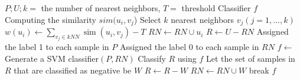 \documentclass{article}
\begin{document}
\begin{algorithm}[!h]
\renewcommand{\algorithmicrequire}{\textbf{Input:}} %
\renewcommand{\algorithmicensure}{\textbf{Output:}} %
	\caption{knn} %
	\begin{algorithmic}[1] %
	    \REQUIRE
	    $P;U;k=$ the number of nearest neighbors, $T=$ threshold 
	    \ENSURE
	    Classifier $f$ \\
		\STATE Computing the similarity $sim(u_i,v_j$)
		\ENDFOR
		\STATE Select $k$ nearest neighbors $v_j(j=1,\dots,k)$
		\STATE $w(u_i)\leftarrow \sum_{v_j\in kNN}\operatorname{sim}\left(u_i, v_j\right)-T$
		\STATE $RN\leftarrow RN\cup u_i$
		\ENDIF
		\ENDFOR
		\STATE $R\leftarrow U-RN$
		\STATE Assigned the label 1 to each sample in $P$
		\STATE Assigned the label 0 to each sample in $RN$
		\STATE $f\leftarrow$ Generate a SVM classifier$(P,RN)$
		\STATE Classify $R$ using $f$
		\STATE Let the set of samples in $R$ that are classified as negative be $W$
		\STATE $R\leftarrow R-W$
		\STATE $RN\leftarrow RN\cup W$
		\ELSE
		\STATE break
		\ENDIF
		\ENDWHILE
		\RETURN $f$
	\end{algorithmic}
\end{algorithm}
\end{document}
